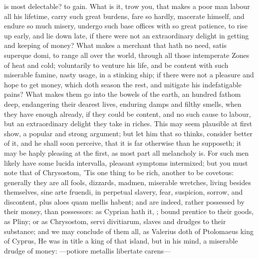 {is most delectable? to gain. What is it, trow you, that makes a poor
man labour all his lifetime, carry such great burdens, fare so hardly,
macerate himself, and endure so much misery, undergo such base offices
with so great patience, to rise up early, and lie down late, if there
were not an extraordinary delight in getting and keeping of money? What
makes a merchant that hath no need, satis superque domi, to range all
over the world, through all those intemperate Zones of heat and
cold; voluntarily to venture his life, and be content with such
miserable famine, nasty usage, in a stinking ship; if there were not a
pleasure and hope to get money, which doth season the rest, and
mitigate his indefatigable pains? What makes them go into the bowels of
the earth, an hundred fathom deep, endangering their dearest lives,
enduring damps and filthy smells, when they have enough already, if
they could be content, and no such cause to labour, but an
extraordinary delight they take in riches. This may seem plausible at
first show, a popular and strong argument; but let him that so thinks,
consider better of it, and he shall soon perceive, that it is far
otherwise than he supposeth; it may be haply pleasing at the first, as
most part all melancholy is. For such men likely have some lucida
intervalla, pleasant symptoms intermixed; but you must note that of
Chrysostom, 'Tis one thing to be rich, another to be covetous:
generally they are all fools, dizzards, madmen, miserable
wretches, living besides themselves, sine arte fruendi, in perpetual
slavery, fear, suspicion, sorrow, and discontent, plus aloes quam
mellis habent; and are indeed, rather possessed by their money, than
possessors: as Cyprian hath it, ; bound
prentice to their goods, as Pliny; or as Chrysostom, servi
divitiarum, slaves and drudges to their substance; and we may conclude
of them all, as Valerius doth of Ptolomaeus king of Cyprus, He
was in title a king of that island, but in his mind, a miserable drudge
of money:
---potiore metallis
libertate carens---

}
